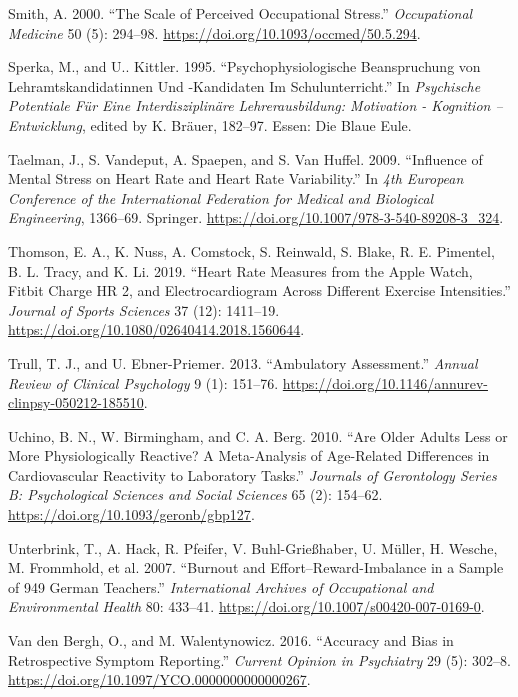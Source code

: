 \documentclass[preprint,
3p]{elsarticle} %
\newlength{\cslhangindent}
\newenvironment{CSLReferences}[2] %
 {\begin{list}{}{%
  \setlength{\itemindent}{0pt}
  \setlength{\leftmargin}{0pt}
  \setlength{\parsep}{0pt}
  \ifodd #1
   \setlength{\leftmargin}{\cslhangindent}
   \setlength{\itemindent}{-1\cslhangindent}
  \fi
  \setlength{\itemsep}{#2\baselineskip}}}
 {\end{list}}
\begin{document}
\begin{CSLReferences}{1}{0}
Smith, A. 2000. {``The Scale of Perceived Occupational Stress.''}
\emph{Occupational Medicine} 50 (5): 294--98.
\url{https://doi.org/10.1093/occmed/50.5.294}.

Sperka, M., and U.. Kittler. 1995. {``Psychophysiologische Beanspruchung
von Lehramtskandidatinnen Und -Kandidaten Im Schulunterricht.''} In
\emph{Psychische Potentiale Für Eine Interdisziplinäre Lehrerausbildung:
Motivation - Kognition -- Entwicklung}, edited by K. Bräuer, 182--97.
Essen: Die Blaue Eule.

Taelman, J., S. Vandeput, A. Spaepen, and S. Van Huffel. 2009.
{``Influence of Mental Stress on Heart Rate and Heart Rate
Variability.''} In \emph{4th European Conference of the International
Federation for Medical and Biological Engineering}, 1366--69. Springer.
\url{https://doi.org/10.1007/978-3-540-89208-3_324}.

Thomson, E. A., K. Nuss, A. Comstock, S. Reinwald, S. Blake, R. E.
Pimentel, B. L. Tracy, and K. Li. 2019. {``Heart Rate Measures from the
Apple Watch, Fitbit Charge HR 2, and Electrocardiogram Across Different
Exercise Intensities.''} \emph{Journal of Sports Sciences} 37 (12):
1411--19. \url{https://doi.org/10.1080/02640414.2018.1560644}.

Trull, T. J., and U. Ebner-Priemer. 2013. {``Ambulatory Assessment.''}
\emph{Annual Review of Clinical Psychology} 9 (1): 151--76.
\url{https://doi.org/10.1146/annurev-clinpsy-050212-185510}.

Uchino, B. N., W. Birmingham, and C. A. Berg. 2010. {``Are Older Adults
Less or More Physiologically Reactive? A Meta-Analysis of Age-Related
Differences in Cardiovascular Reactivity to Laboratory Tasks.''}
\emph{Journals of Gerontology Series B: Psychological Sciences and
Social Sciences} 65 (2): 154--62.
\url{https://doi.org/10.1093/geronb/gbp127}.

Unterbrink, T., A. Hack, R. Pfeifer, V. Buhl-Grießhaber, U. Müller, H.
Wesche, M. Frommhold, et al. 2007. {``Burnout and
Effort--Reward-Imbalance in a Sample of 949 German Teachers.''}
\emph{International Archives of Occupational and Environmental Health}
80: 433--41. \url{https://doi.org/10.1007/s00420-007-0169-0}.

Van den Bergh, O., and M. Walentynowicz. 2016. {``Accuracy and Bias in
Retrospective Symptom Reporting.''} \emph{Current Opinion in Psychiatry}
29 (5): 302--8. \url{https://doi.org/10.1097/YCO.0000000000000267}.


\end{CSLReferences}
\end{document}
